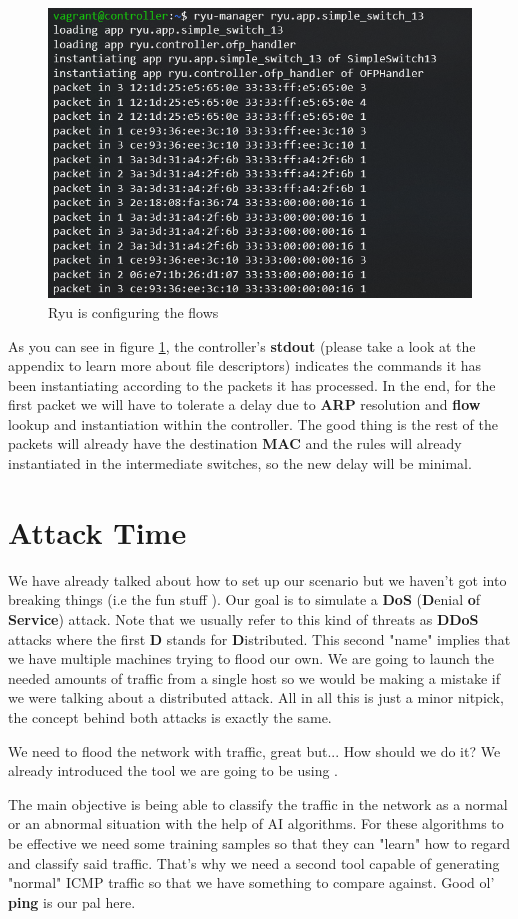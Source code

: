 \documentclass[12pt]{report}
\newcommand{\newpar} {
    \vskip 1cm
}
\begin{document}
			\begin{figure}
				\centering
				\includegraphics[scale = 1]{ryu_rcv.png}
				\caption{Ryu is configuring the flows}
				\label{f:ryu_rcv}
			\end{figure}

			As you can see in figure \ref{f:ryu_rcv}, the controller's \textbf{stdout} (please take a look at the appendix to learn more about file descriptors) indicates the commands it has been instantiating according to the packets it has processed. In the end, for the first packet we will have to tolerate a delay due to \textbf{ARP} resolution and \textbf{flow} lookup and instantiation within the controller. The good thing is the rest of the packets will already have the destination \textbf{MAC} and the rules will already instantiated in the intermediate switches, so the new delay will be minimal.

	\section{Attack Time}
		We have already talked about how to set up our scenario but we haven't got into breaking things (i.e the fun stuff  ). Our goal is to simulate a \textbf{DoS} (\textbf{D}enial \textbf{o}f \textbf{Service}) attack. Note that we usually refer to this kind of threats as \textbf{DDoS} attacks where the first \textbf{D} stands for \textbf{D}istributed. This second "name" implies that we have multiple machines trying to flood our own. We are going to launch the needed amounts of traffic from a single host so we would be making a mistake if we were talking about a distributed attack. All in all this is just a minor nitpick, the concept behind both attacks is exactly the same.
		\newpar
		We need to flood the network with traffic, great but... How should we do it? We already introduced the tool we are going to be using .
		\newpar
		The main objective is being able to classify the traffic in the network as a normal or an abnormal situation with the help of AI algorithms. For these algorithms to be effective we need some training samples so that they can "learn" how to regard and classify said traffic. That's why we need a second tool capable of generating "normal" ICMP traffic so that we have something to compare against. Good ol' \textbf{ping} is our pal here.
\end{document}

